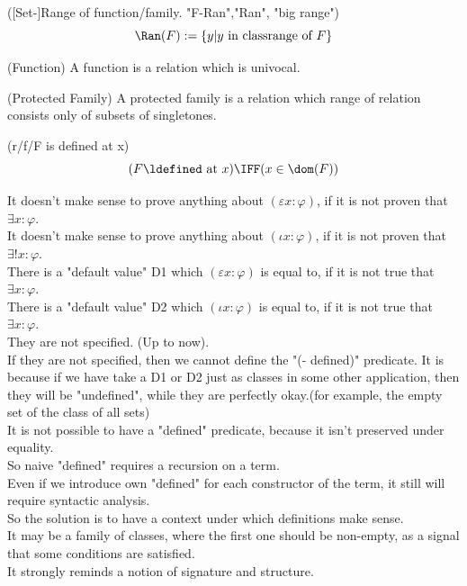 \begin{definition}([Set-]Range of function/family. "F-Ran","Ran", "big range")
\[
\Ran(F):=\{y| y\mbox{ in classrange of } F\}
\]
\end{definition}

\begin{definition}(Function)
A function is a relation which is univocal.
\end{definition}
\begin{definition}(Protected Family)
A protected family is a relation which range of relation consists only of subsets of singletones.
\end{definition}



\begin{definition}(r/f/F is defined at x)
\[
(F \ldefined\mbox{ at }x) \IFF (x\in\dom(F))
\]
\end{definition}
It doesn't make sense to prove anything about $(\varepsilon x:\varphi)$, if it is not proven that $\exists x: \varphi$.\\
It doesn't make sense to prove anything about $(\iota x:\varphi)$, if it is not proven that $\exists! x: \varphi$.\\
There is a "default value" D1 which $(\varepsilon x:\varphi)$ is equal to, if it is not true that $\exists x: \varphi$.\\
There is a "default value" D2 which $(\iota x:\varphi)$ is equal to, if it is not true that $\exists x: \varphi$.\\
They are not specified. (Up to now).\\
If they are not specified, then we cannot define the "(- defined)" predicate.
It is because if we have take a D1 or D2 just as classes in some other application, then they will be "undefined", while they are perfectly okay.(for example, the empty set of the class of all sets)\\
It is not possible to have a "defined" predicate, because it isn't preserved under equality.\\
So naive "defined" requires a recursion on a term.\\
Even if we introduce own "defined" for each constructor of the term, it still will require syntactic analysis.\\
So the solution is to have a context under which definitions make sense.\\
It may be a family of classes, where the first one should be non-empty, as a signal that some conditions are satisfied.\\
It strongly reminds a notion of signature and structure.\\

